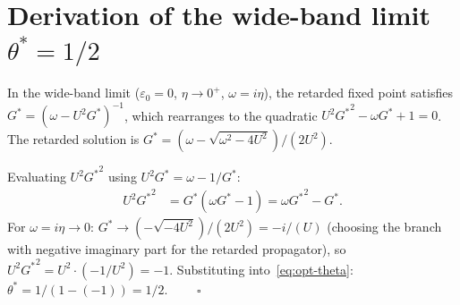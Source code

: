 \documentclass[aps,prb,twocolumn,superscriptaddress,nofootinbib,longbibliography,floatfix]{revtex4-2}
\newcommand{\optparam}{\theta^{*}}
\newcommand{\Gstar}{G^{*}}
\theoremstyle{plain}
\theoremstyle{remark}
\begin{document}
\appendix

\section{Derivation of the wide-band limit $\theta^* = 1/2$}
\label{app:wideband}

In the wide-band limit ($\varepsilon_0 = 0$, $\eta \to 0^+$,
$\omega = i\eta$), the retarded fixed point satisfies
$\Gstar = (\omega - U^2\Gstar)^{-1}$, which rearranges to the
quadratic $U^2{\Gstar}^2 - \omega\Gstar + 1 = 0$.  The retarded
solution is $\Gstar = (\omega - \sqrt{\omega^2 - 4U^2})/(2U^2)$.

Evaluating $U^2{\Gstar}^2$ using $U^2\Gstar = \omega - 1/\Gstar$:
%
\begin{align}
  U^2{\Gstar}^2 &= \Gstar(\omega\Gstar - 1)
               = \omega{\Gstar}^2 - \Gstar.
\end{align}
%
For $\omega = i\eta \to 0$: $\Gstar \to (-\sqrt{-4U^2})/(2U^2)
= -i/(U)$ (choosing the branch with negative imaginary part
for the retarded propagator), so
$U^2{\Gstar}^2 = U^2 \cdot (-1/U^2) = -1$.
Substituting into~\eqref{eq:opt-theta}:
$\optparam = 1/(1 - (-1)) = 1/2$. $\qquad\square$


\end{document}
